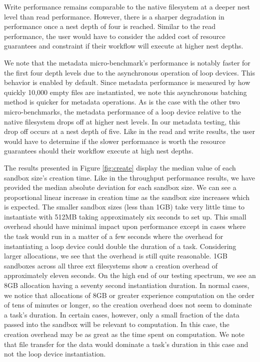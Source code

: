 \documentclass[conference]{IEEEtran}
\begin{document}
Write performance remains comparable to the native filesystem at a deeper nest level than read performance. However, there is a sharper degradation in performance once a nest depth of four is reached. Similar to the read performance, the user would have to consider the added cost of resource guarantees and constraint if their workflow will execute at higher nest depths. 

We note that the metadata micro-benchmark's performance is notably faster for the first four depth levels due to the asynchronous operation of loop devices. This behavior is enabled by default. Since metadata performance is measured by how quickly 10,000 empty files are instantiated, we note this asynchronous batching method is quicker for metadata operations. As is the case with the other two micro-benchmarks, the metadata performance of a loop device relative to the native filesystem drops off at higher nest levels. In our metadata testing, this drop off occurs at a nest depth of five. Like in the read and write results, the user would have to determine if the slower performance is worth the resource guarantees should their workflow execute at high nest depths.

The results presented in Figure \ref{fig:create} display the median value of each sandbox size's creation time. Like in the throughput performance results, we have provided the median absolute deviation for each sandbox size. We can see a proportional linear increase in creation time as the sandbox size increases which is expected. The smaller sandbox sizes (less than 1GB) take very little time to instantiate with 512MB taking approximately six seconds to set up. This small overhead should have minimal impact upon performance except in cases where the task would run in a matter of a few seconds where the overhead for instantiating a loop device could double the duration of a task. Considering larger allocations, we see that the overhead is still quite reasonable. 1GB sandboxes across all three ext filesystems show a creation overhead of approximately eleven seconds. On the high end of our testing spectrum, we see an 8GB allocation having a seventy second instantiation duration. In normal cases, we notice that allocations of 8GB or greater experience computation on the order of tens of minutes or longer, so the creation overhead does not seem to dominate a task's duration. In certain cases, however, only a small fraction of the data passed into the sandbox will be relevant to computation. In this case, the creation overhead may be as great as the time spent on computation. We note that file transfer for the data would dominate a task's duration in this case and not the loop device instantiation.
\end{document}
